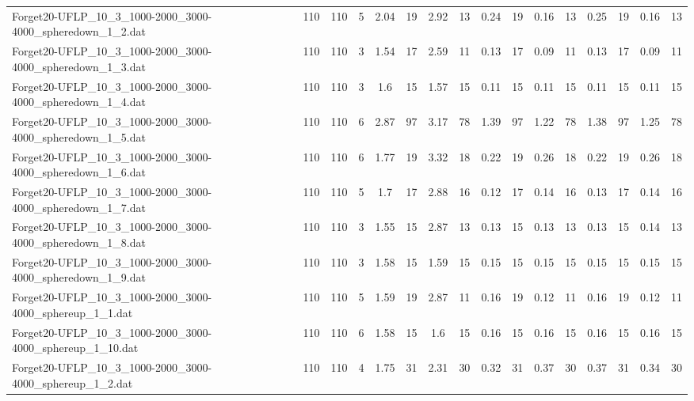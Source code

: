 \begin{sidewaystable}[!ht]
{\begin{tabular}{lccccccccccccccc}
Forget20-UFLP\_10\_3\_1000-2000\_3000-4000\_spheredown\_1\_2.dat & 110 & 110 & 5 & 2.04 & 19 & 2.92 & 13 & 0.24 & 19 &  \textcolor{blue2}{0.16} & 13 & 0.25 & 19 &  \textcolor{blue2}{0.16} & 13 \\
Forget20-UFLP\_10\_3\_1000-2000\_3000-4000\_spheredown\_1\_3.dat & 110 & 110 & 3 & 1.54 & 17 & 2.59 & 11 & 0.13 & 17 &  \textcolor{blue2}{0.09} & 11 & 0.13 & 17 &  \textcolor{blue2}{0.09} & 11 \\
Forget20-UFLP\_10\_3\_1000-2000\_3000-4000\_spheredown\_1\_4.dat & 110 & 110 & 3 & 1.6 & 15 & 1.57 & 15 &  \textcolor{blue2}{0.11} & 15 &  \textcolor{blue2}{0.11} & 15 &  \textcolor{blue2}{0.11} & 15 &  \textcolor{blue2}{0.11} & 15 \\
Forget20-UFLP\_10\_3\_1000-2000\_3000-4000\_spheredown\_1\_5.dat & 110 & 110 & 6 & 2.87 & 97 & 3.17 & 78 & 1.39 & 97 & 1.22 & 78 & 1.38 & 97 & 1.25 & 78 \\
Forget20-UFLP\_10\_3\_1000-2000\_3000-4000\_spheredown\_1\_6.dat & 110 & 110 & 6 & 1.77 & 19 & 3.32 & 18 &  \textcolor{blue2}{0.22} & 19 & 0.26 & 18 &  \textcolor{blue2}{0.22} & 19 & 0.26 & 18 \\
Forget20-UFLP\_10\_3\_1000-2000\_3000-4000\_spheredown\_1\_7.dat & 110 & 110 & 5 & 1.7 & 17 & 2.88 & 16 &  \textcolor{blue2}{0.12} & 17 & 0.14 & 16 & 0.13 & 17 & 0.14 & 16 \\
Forget20-UFLP\_10\_3\_1000-2000\_3000-4000\_spheredown\_1\_8.dat & 110 & 110 & 3 & 1.55 & 15 & 2.87 & 13 &  \textcolor{blue2}{0.13} & 15 &  \textcolor{blue2}{0.13} & 13 &  \textcolor{blue2}{0.13} & 15 & 0.14 & 13 \\
Forget20-UFLP\_10\_3\_1000-2000\_3000-4000\_spheredown\_1\_9.dat & 110 & 110 & 3 & 1.58 & 15 & 1.59 & 15 &  \textcolor{blue2}{0.15} & 15 &  \textcolor{blue2}{0.15} & 15 &  \textcolor{blue2}{0.15} & 15 &  \textcolor{blue2}{0.15} & 15 \\
Forget20-UFLP\_10\_3\_1000-2000\_3000-4000\_sphereup\_1\_1.dat & 110 & 110 & 5 & 1.59 & 19 & 2.87 & 11 & 0.16 & 19 &  \textcolor{blue2}{0.12} & 11 & 0.16 & 19 &  \textcolor{blue2}{0.12} & 11 \\
Forget20-UFLP\_10\_3\_1000-2000\_3000-4000\_sphereup\_1\_10.dat & 110 & 110 & 6 & 1.58 & 15 & 1.6 & 15 &  \textcolor{blue2}{0.16} & 15 &  \textcolor{blue2}{0.16} & 15 &  \textcolor{blue2}{0.16} & 15 &  \textcolor{blue2}{0.16} & 15 \\
Forget20-UFLP\_10\_3\_1000-2000\_3000-4000\_sphereup\_1\_2.dat & 110 & 110 & 4 & 1.75 & 31 & 2.31 & 30 &  \textcolor{blue2}{0.32} & 31 & 0.37 & 30 & 0.37 & 31 & 0.34 & 30 \\

\end{tabular}}
\end{sidewaystable}
